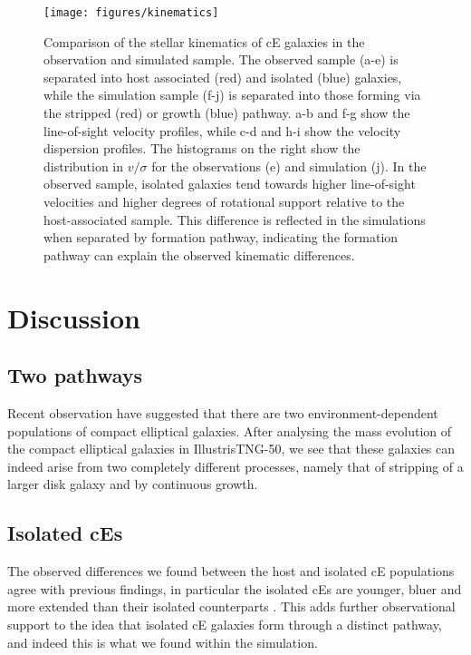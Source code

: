 \documentclass[a4paper,fleqn,usenatbib]{mnras}
\begin{document}
\begin{figure*}
\texttt{[image: figures/kinematics]}
   \caption{Comparison of the stellar kinematics of cE galaxies in the observation and simulated sample. The observed sample (a-e) is separated into host associated (red) and isolated (blue) galaxies, while the simulation sample (f-j) is separated into those forming via the stripped (red) or growth (blue) pathway. a-b and f-g show the line-of-sight velocity profiles, while c-d and h-i show the velocity dispersion profiles. The histograms on the right show the distribution in $v/\sigma$ for the observations (e) and simulation (j). In the observed sample, isolated galaxies tend towards higher line-of-sight velocities and higher degrees of rotational support relative to the host-associated sample. This difference is reflected in the simulations when separated by formation pathway, indicating the formation pathway can explain the observed kinematic differences.}
 \label{kinematics}
 \label{kinematics}
 \end{figure*}



\section{Discussion}

\subsection{Two pathways}

Recent observation have suggested that there are two environment-dependent populations of compact elliptical galaxies. After analysing the mass evolution of the compact elliptical galaxies in IllustrisTNG-50, we see that these galaxies can indeed arise from two completely different processes, namely that of stripping of a larger disk galaxy and by continuous growth. 

\subsection{Isolated cEs}

The observed differences we found between the host and isolated cE populations agree with previous findings, in particular the isolated cEs are younger, bluer and more extended than their isolated counterparts \citep{2018MNRAS.473.1819F}. This adds further observational support to the idea that isolated cE galaxies form through a distinct pathway, and indeed this is what we found within the simulation.
\end{document}
